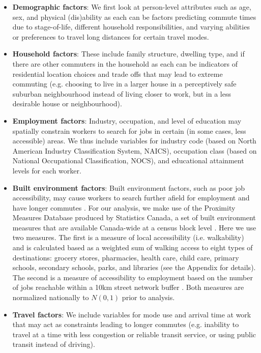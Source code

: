\documentclass[10 pt,letterpaper]{article}
\begin{document}
\begin{itemize}
	
	\item \textbf{Demographic factors}: We first look at person-level attributes such as age, sex, and physical (dis)ability as each can be factors predicting commute times due to stage-of-life, different household responsibilities, and varying abilities or preferences to travel long distances for certain travel modes.
	
	\item \textbf{Household factors}: These include family structure, dwelling type, and if there are other commuters in the household as each can be indicators of residential location choices and trade offs that may lead to extreme commuting (e.g. choosing to live in a larger house in a perceptively safe suburban neighbourhood instead of living closer to work, but in a less desirable house or neighbourhood).
	
	\item \textbf{Employment factors}: Industry, occupation, and level of education may spatially constrain workers to search for jobs in certain (in some cases, less accessible) areas. We thus include variables for industry code (based on North American Industry Classification System, NAICS), occupation class (based on National Occupational Classification, NOCS), and educational attainment levels for each worker.
	
	\item \textbf{Built environment factors}: Built environment factors, such as poor job accessibility, may cause workers to search further afield for employment and have longer commutes \cite{hu_changing_2015,cui_accessibility_2019}. For our analysis, we make use of the Proximity Measures Database produced by Statistics Canada, a set of built environment measures that are available Canada-wide at a census block level \cite{statistics_canada_proximity_2020}. Here we use two measures. The first is a measure of local accessibility (i.e. walkability) and is calculated based as a weighted sum of walking access to eight types of destinations: grocery stores, pharmacies, health care, child care, primary schools, secondary schools, parks, and libraries (see the Appendix for details). The second is a measure of accessibility to employment based on the number of jobs reachable within a 10km street network buffer \cite{statistics_canada_proximity_2020}. Both measures are normalized nationally to $N(0,1)$ prior to analysis. 
	
	\item \textbf{Travel factors}: We include variables for mode use and arrival time at work that may act as constraints leading to longer commutes (e.g. inability to travel at a time with less congestion or reliable transit service, or using public transit instead of driving).
	

\end{itemize}
\end{document}
